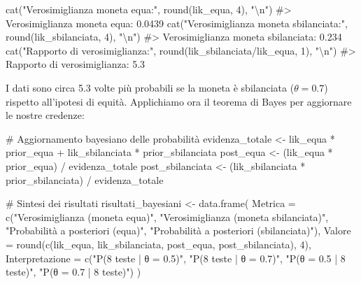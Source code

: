 \documentclass[
  letterpaper,
  DIV=11,
  numbers=noendperiod,
  oneside]{scrreprt}
\newenvironment{Shaded}{\begin{snugshade}}{\end{snugshade}}
\newcommand{\AttributeTok}[1]{\textcolor[rgb]{0.40,0.45,0.13}{#1}}
\newcommand{\CommentTok}[1]{\textcolor[rgb]{0.37,0.37,0.37}{#1}}
\newcommand{\DecValTok}[1]{\textcolor[rgb]{0.68,0.00,0.00}{#1}}
\newcommand{\FunctionTok}[1]{\textcolor[rgb]{0.28,0.35,0.67}{#1}}
\newcommand{\NormalTok}[1]{\textcolor[rgb]{0.00,0.23,0.31}{#1}}
\newcommand{\OtherTok}[1]{\textcolor[rgb]{0.00,0.23,0.31}{#1}}
\newcommand{\SpecialCharTok}[1]{\textcolor[rgb]{0.37,0.37,0.37}{#1}}
\newcommand{\StringTok}[1]{\textcolor[rgb]{0.13,0.47,0.30}{#1}}
\theoremstyle{definition}
\theoremstyle{plain}
\theoremstyle{definition}
\theoremstyle{remark}
\begin{document}
\begin{tcolorbox}
\begin{Shaded}
\begin{Highlighting}[]
\FunctionTok{cat}\NormalTok{(}\StringTok{"Verosimiglianza moneta equa:"}\NormalTok{, }\FunctionTok{round}\NormalTok{(lik\_equa, }\DecValTok{4}\NormalTok{), }\StringTok{"}\SpecialCharTok{\textbackslash{}n}\StringTok{"}\NormalTok{)}
\CommentTok{\#\textgreater{} Verosimiglianza moneta equa: 0.0439}
\FunctionTok{cat}\NormalTok{(}\StringTok{"Verosimiglianza moneta sbilanciata:"}\NormalTok{, }\FunctionTok{round}\NormalTok{(lik\_sbilanciata, }\DecValTok{4}\NormalTok{), }\StringTok{"}\SpecialCharTok{\textbackslash{}n}\StringTok{"}\NormalTok{)}
\CommentTok{\#\textgreater{} Verosimiglianza moneta sbilanciata: 0.234}
\FunctionTok{cat}\NormalTok{(}\StringTok{"Rapporto di verosimiglianza:"}\NormalTok{, }\FunctionTok{round}\NormalTok{(lik\_sbilanciata}\SpecialCharTok{/}\NormalTok{lik\_equa, }\DecValTok{1}\NormalTok{), }\StringTok{"}\SpecialCharTok{\textbackslash{}n}\StringTok{"}\NormalTok{)}
\CommentTok{\#\textgreater{} Rapporto di verosimiglianza: 5.3}
\end{Highlighting}
\end{Shaded}

I dati sono circa 5.3 volte più probabili se la moneta è sbilanciata
(\(\theta = 0.7\)) rispetto all'ipotesi di equità. Applichiamo ora il
teorema di Bayes per aggiornare le nostre credenze:

\begin{Shaded}
\begin{Highlighting}[]
\CommentTok{\# Aggiornamento bayesiano delle probabilità}
\NormalTok{evidenza\_totale }\OtherTok{\textless{}{-}}\NormalTok{ lik\_equa }\SpecialCharTok{*}\NormalTok{ prior\_equa }\SpecialCharTok{+}\NormalTok{ lik\_sbilanciata }\SpecialCharTok{*}\NormalTok{ prior\_sbilanciata}
\NormalTok{post\_equa }\OtherTok{\textless{}{-}}\NormalTok{ (lik\_equa }\SpecialCharTok{*}\NormalTok{ prior\_equa) }\SpecialCharTok{/}\NormalTok{ evidenza\_totale}
\NormalTok{post\_sbilanciata }\OtherTok{\textless{}{-}}\NormalTok{ (lik\_sbilanciata }\SpecialCharTok{*}\NormalTok{ prior\_sbilanciata) }\SpecialCharTok{/}\NormalTok{ evidenza\_totale}

\CommentTok{\# Sintesi dei risultati}
\NormalTok{risultati\_bayesiani }\OtherTok{\textless{}{-}} \FunctionTok{data.frame}\NormalTok{(}
  \AttributeTok{Metrica =} \FunctionTok{c}\NormalTok{(}\StringTok{"Verosimiglianza (moneta equa)"}\NormalTok{, }
              \StringTok{"Verosimiglianza (moneta sbilanciata)"}\NormalTok{, }
              \StringTok{"Probabilità a posteriori (equa)"}\NormalTok{, }
              \StringTok{"Probabilità a posteriori (sbilanciata)"}\NormalTok{),}
  \AttributeTok{Valore =} \FunctionTok{round}\NormalTok{(}\FunctionTok{c}\NormalTok{(lik\_equa, lik\_sbilanciata, post\_equa, post\_sbilanciata), }\DecValTok{4}\NormalTok{),}
  \AttributeTok{Interpretazione =} \FunctionTok{c}\NormalTok{(}\StringTok{"P(8 teste | θ = 0.5)"}\NormalTok{,}
                     \StringTok{"P(8 teste | θ = 0.7)"}\NormalTok{, }
                     \StringTok{"P(θ = 0.5 | 8 teste)"}\NormalTok{,}
                     \StringTok{"P(θ = 0.7 | 8 teste)"}\NormalTok{)}
\NormalTok{)}


\end{Highlighting}
\end{Shaded}
\end{tcolorbox}
\end{document}
